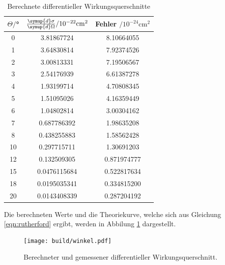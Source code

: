 \begin{table}[H]
  \centering
  \caption{Berechnete differentieller Wirkungsquerschnitte}
  \label{tab:Parameter}
  \begin{tabular}{c c c}
    \toprule
    $\Theta/$° & $\frac{\symup{d}\sigma}{\symup{d}\Omega}/ \mathrm{10^{-22}cm^2}$ & Fehler $/ \mathrm{10^{-24}cm^2}$  \\
    \midrule
     0  &  3.81867724      & 8.10664055  \\
     1  &  3.64830814      & 7.92374526  \\
     2  &  3.00813331      & 7.19506567  \\
     3  &  2.54176939      & 6.61387278  \\
     4  &  1.93199714      & 4.70808345  \\
     5  &  1.51095026      & 4.16359449  \\
     6  &  1.04802814      & 3.00304162  \\
     7  &  0.687786392     & 1.98635208  \\
     8  &  0.438255883     & 1.58562428  \\
    10  &  0.297715711     & 1.30691203  \\
    12  &  0.132509305     & 0.871974777 \\
    15  &  0.0476115684    & 0.522817634 \\
    18  &  0.0195035341    & 0.334815200 \\
    20  &  0.0143408339    & 0.287204192 \\
      \bottomrule
  \end{tabular}
\end{table}

Die berechneten Werte und die Theoriekurve, welche sich aus Gleichung \ref{eqn:rutherford} ergibt, werden in Abbilung \ref{fig:wirkungsquerschnitt} dargestellt.

\begin{figure}[H]
  \centering
  \texttt{[image: build/winkel.pdf]}
  \caption{Berechneter und gemessener differentieller Wirkungsquerschnitt.}
  \label{fig:wirkungsquerschnitt}
\end{figure}


